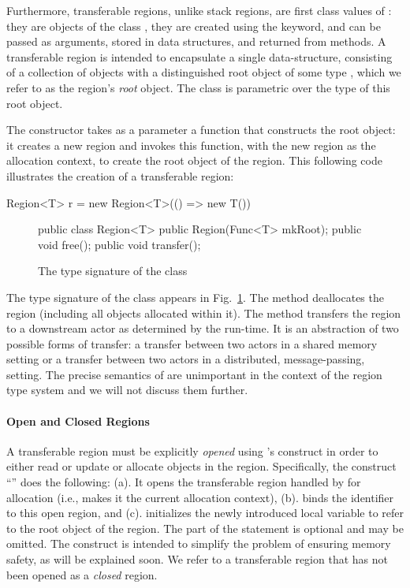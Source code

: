 Furthermore, transferable regions, unlike stack regions, are first class values of \name:
they are objects of the class , 
they are created using the  keyword,
and can be passed as arguments, stored in data structures, and returned from methods.
A transferable region is intended to encapsulate a single data-structure,
consisting of a collection of objects with a distinguished root object of some type ,
which we refer to as the region's \emph{root} object.
The class  is parametric over the type  of this root object.

The  constructor takes as a parameter a function that constructs
the root object: it creates a new region and invokes this function, with the new
region as the allocation context, to create the root object of the region.
This following code illustrates the creation of a transferable region:
\begin{codejava}
  Region<T> r = new Region<T>(() => new T())
\end{codejava}


\begin{figure}
\begin{codejava}
  public class Region<T> {
    public Region(Func<T> mkRoot);
    public void free();
    public void transfer();
  }
\end{codejava}
\caption{The type signature of the  class}
\label{fig:region-class}
\end{figure}

The type signature of the class  appears in Fig.~\ref{fig:region-class}.
The method  deallocates the region (including all objects allocated within it).
The method  transfers the region to a downstream actor as determined by the run-time.
It is an abstraction of two possible forms of  transfer: a transfer between two actors in a shared
memory setting or a transfer between two actors in a distributed, message-passing, setting. 
The precise semantics of  are unimportant in the context of the region type
system and we will not discuss them further.

\paragraph{Open and Closed Regions}
A transferable region must be explicitly \emph{opened} using \name's  construct
in order to either read or update or allocate objects in the region.
Specifically, the construct ``'' does the following:
(a). It opens the transferable region handled by  for allocation
(i.e., makes it the current allocation context),
(b). binds the identifier  to this open region, and
(c). initializes the newly introduced local variable  to refer
to the root object of the region.
The  part of the statement is optional and may be omitted.
The  construct is intended to simplify the problem of ensuring memory safety,
as will be explained soon.
We refer to a transferable region that has not been opened as a \emph{closed} region.

